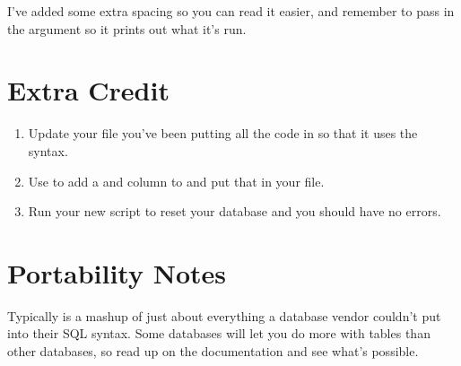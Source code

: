 I've added some extra spacing so you can read it easier, and remember to 
pass in the  argument so it prints out what it's run.

\section{Extra Credit}

\begin{enumerate}
\item Update your  file you've been putting all the code in so that it
    uses the  syntax.
\item Use  to add a  and  column
    to  and put that in your  file.
\item Run your new  script to reset your database and you should
    have no errors.
\end{enumerate}

\section{Portability Notes}

Typically  is a mashup of just about everything a database
vendor couldn't put into their SQL syntax.  Some databases will let you do
more with tables than other databases, so read up on the documentation and
see what's possible.

